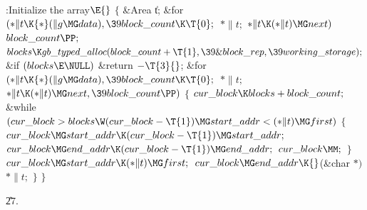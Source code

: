 \Y\B\4:Initialize the  array\X${}\E{}$\6
${}\{{}$\5
\1\&{Area} \|t;\7
\&{for} ${}({*}\|t\K{*}(\|g\MG\\{data}),\39\\{block\_count}\K\T{0};{}$ ${}{*}%
\|t;{}$ ${}{*}\|t\K({*}\|t)\MG\\{next}){}$\1\5
${}\\{block\_count}\PP;{}$\2\6
${}\\{blocks}\K\\{gb\_typed\_alloc}(\\{block\_count}+\T{1},\39\&{block\_rep},%
\39\\{working\_storage});{}$\6
\&{if} ${}(\\{blocks}\E\NULL){}$\1\5
\&{return} ${}{-}\T{3}{}$;\2\6
\&{for} ${}({*}\|t\K{*}(\|g\MG\\{data}),\39\\{block\_count}\K\T{0};{}$ ${}{*}%
\|t;{}$ ${}{*}\|t\K({*}\|t)\MG\\{next},\39\\{block\_count}\PP){}$\5
${}\{{}$\1\6
${}\\{cur\_block}\K\\{blocks}+\\{block\_count};{}$\6
\&{while} ${}(\\{cur\_block}>\\{blocks}\W(\\{cur\_block}-\T{1})\MG\\{start%
\_addr}<({*}\|t)\MG\\{first}){}$\5
${}\{{}$\1\6
${}\\{cur\_block}\MG\\{start\_addr}\K(\\{cur\_block}-\T{1})\MG\\{start%
\_addr};{}$\6
${}\\{cur\_block}\MG\\{end\_addr}\K(\\{cur\_block}-\T{1})\MG\\{end\_addr};{}$\6
${}\\{cur\_block}\MM;{}$\6
\4${}\}{}$\2\6
${}\\{cur\_block}\MG\\{start\_addr}\K({*}\|t)\MG\\{first};{}$\6
${}\\{cur\_block}\MG\\{end\_addr}\K{}$(\&{char} ${}{*}){}$ ${}{*}\|t;{}$\6
\4${}\}{}$\2\6
\4${}\}{}$\2\par
\U27.\fi


